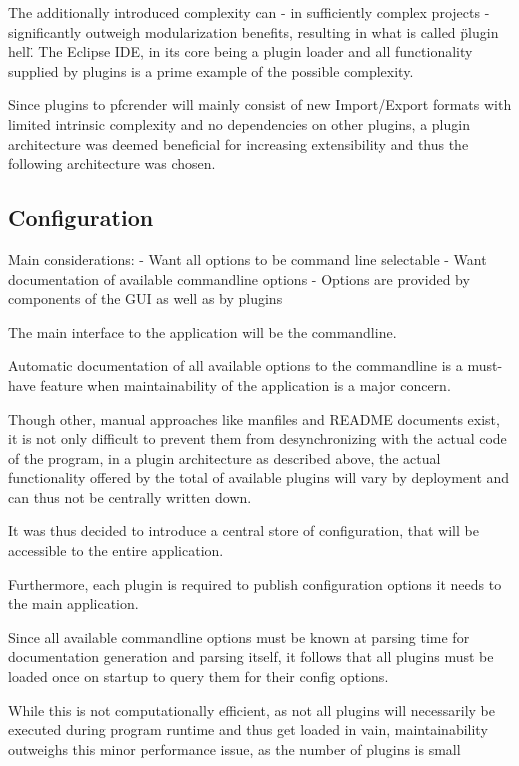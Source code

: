 The additionally introduced complexity can - in sufficiently complex projects - significantly outweigh modularization benefits, resulting in what is called \"plugin hell\". %
The Eclipse IDE, in its core being a plugin loader and all functionality supplied by plugins is a prime example of the possible complexity.

Since plugins to pfcrender will mainly consist of new Import/Export formats with limited intrinsic complexity and no dependencies on other plugins, a plugin architecture was deemed beneficial for increasing extensibility and thus the following architecture was chosen.


\subsection{Configuration}
Main considerations:
- Want all options to be command line selectable
- Want documentation of available commandline options
- Options are provided by components of the GUI as well as by plugins

The main interface to the application will be the commandline.

Automatic documentation of all available options to the commandline is a must-have feature when maintainability of the application is a major concern.

Though other, manual approaches like manfiles and README documents exist, it is not only difficult to prevent them from desynchronizing with the actual code of the program, in a plugin architecture as described above, the actual functionality offered by the total of available plugins will vary by deployment and can thus not be centrally written down.

It was thus decided to introduce a central store of configuration, that will be accessible to the entire application.

Furthermore, each plugin is required to publish configuration options it needs to the main application.

Since all available commandline options must be known at parsing time for documentation generation and parsing itself, it follows that all plugins must be loaded once on startup to query them for their config options.

While this is not computationally efficient, as not all plugins will necessarily be executed during program runtime and thus get loaded in vain, maintainability outweighs this minor performance issue, as the number of plugins is small


